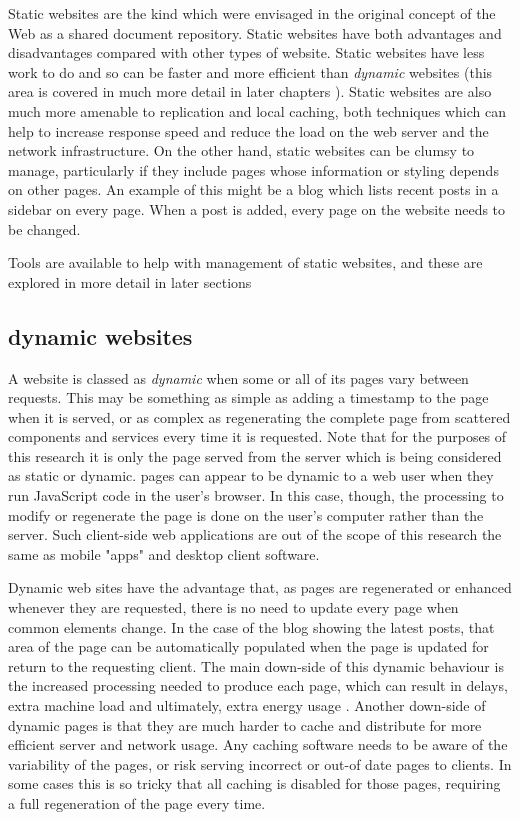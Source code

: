 Static websites are the kind which were envisaged in the original concept of the Web as a shared document repository. Static websites have both advantages and disadvantages compared with other types of website. Static websites have less work to do and so can be faster and more efficient than \emph{dynamic} websites (this area is covered in much more detail in later chapters ). Static websites are also much more amenable to replication and local caching, both techniques which can help to increase response speed and reduce the load on the web server and the network infrastructure. On the other hand, static websites can be clumsy to manage, particularly if they include pages whose information or styling depends on other pages. An example of this might be a blog which lists recent posts in a sidebar on every page. When a post is added, every page on the website needs to be changed.

Tools are available to help with management of static websites, and these are explored in more detail in later sections 

\subsection{dynamic websites}
A website is classed as \emph{dynamic} when some or all of its pages vary between requests. This may be something as simple as adding a timestamp to the page when it is served, or as complex as regenerating the complete page from scattered components and services every time it is requested. Note that for the purposes of this research it is only the page served from the server which is being considered as static or dynamic. pages can appear to be dynamic to a web user when they run JavaScript code in the user's browser. In this case, though, the processing to modify or regenerate the page is done on the user's computer rather than the server. Such client-side web applications are out of the scope of this research the same as mobile "apps" and desktop client software.

Dynamic web sites have the advantage that, as pages are regenerated or enhanced whenever they are requested, there is no need to update every page when common elements change. In the case of the blog showing the latest posts, that area of the page can be automatically populated when the page is updated for return to the requesting client. The main down-side of this dynamic behaviour is the increased processing needed to produce each page, which can result in delays, extra machine load and ultimately, extra energy usage . Another down-side of dynamic pages is that they are much harder to cache and distribute for more efficient server and network usage. Any caching software needs to be aware of the variability of the pages, or risk serving incorrect or out-of date pages to clients. In some cases this is so tricky that all caching is disabled for those pages, requiring a full regeneration of the page every time.

